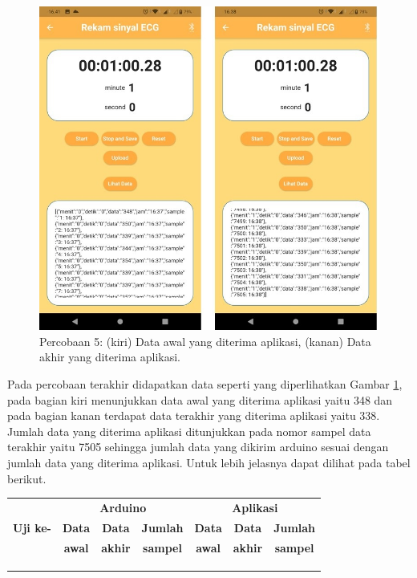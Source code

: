 \begin{figure}[H] \centering
	\includegraphics[width=1\textwidth]{img/percob/Slide15}
	\caption{Percobaan 5: (kiri) Data awal yang diterima aplikasi, (kanan) Data akhir yang diterima aplikasi.}
	\label{fig:4.2.8}
\end{figure}
Pada percobaan terakhir didapatkan data seperti yang diperlihatkan Gambar \ref{fig:4.2.8}, pada bagian kiri menunjukkan data awal yang diterima aplikasi yaitu 348 dan pada bagian kanan terdapat data terakhir yang diterima aplikasi yaitu 338. Jumlah data yang diterima aplikasi ditunjukkan pada nomor sampel data terakhir yaitu 7505 sehingga jumlah data yang dikirim arduino sesuai dengan jumlah data yang diterima aplikasi. Untuk lebih jelasnya dapat dilihat pada tabel berikut.

\begin{table}[H]
	\begin{tabular}{|c|c|c|c|c|c|c|}
		\hline
		\multirow{3}{*}{\textbf{Uji ke-}} & \multicolumn{3}{|c|}{\textbf{Arduino}}& \multicolumn{3}{|c|}{\textbf{Aplikasi}}\\
		\cline{2-7} & \textbf{Data} & \textbf{Data} & \textbf{Jumlah}& \textbf{Data}&\textbf{Data}&\textbf{Jumlah}\\
		 & \textbf{awal} & \textbf{akhir} & \textbf{sampel}& \textbf{awal}&\textbf{akhir}&\textbf{sampel}\\
		\hline& & & &&&\\&&&& & & \\& & &&&& \\
		\hline
	\end{tabular}
\end{table}

